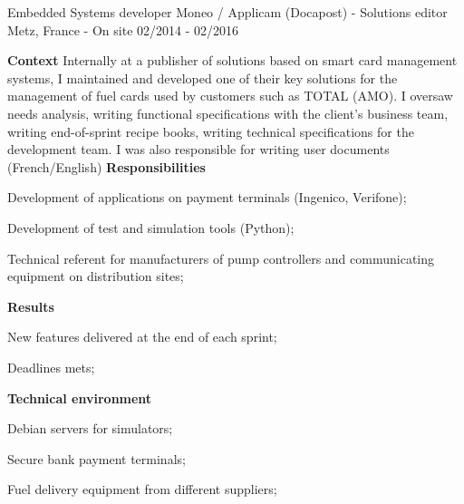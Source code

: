 \begin{cventries}
  \cventry
    {Embedded Systems developer} %
    {Moneo / Applicam (Docapost) - Solutions editor} %
    {Metz, France - On site} %
    {02/2014 - 02/2016} %
    {
      \textbf{Context}
      \newline
      Internally at a publisher of solutions based on smart card management systems, 
      I maintained and developed one of their key solutions for the management of 
      fuel cards used by customers such as TOTAL (AMO).
      \newline
      I oversaw needs analysis, writing functional specifications with the client's 
      business team, writing end-of-sprint recipe books, writing technical specifications 
      for the development team. 
      \newline
      I was also responsible for writing user documents (French/English)
      \newline \vspace{2pt}
      \textbf{Responsibilities}
      \newline \vspace{12pt}
      \begin{cvitems}
        \item {Development of applications on payment terminals (Ingenico, Verifone);}
        \item {Development of test and simulation tools (Python);}
        \item {Technical referent for manufacturers of pump controllers and communicating equipment on distribution sites;}
      \end{cvitems}
      \textbf{Results}
      \newline \vspace{12pt}
      \begin{cvitems}
        \item {New features delivered at the end of each sprint;}
        \item {Deadlines mets;}
      \end{cvitems}
      \textbf{Technical environment}
      \newline \vspace{12pt}
      \begin{cvitems}
        \item {Debian servers for simulators;}
        \item {Secure bank payment terminals;}
        \item {Fuel delivery equipment from different suppliers;}
      \end{cvitems}
    }



  \end{cventries}
